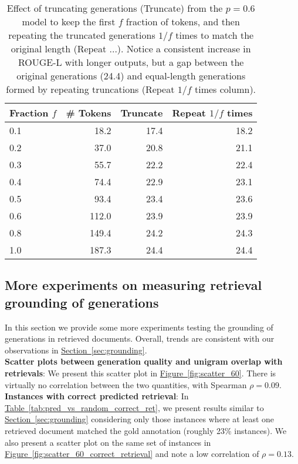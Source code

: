 \documentclass[11pt]{article}
\newcommand{\namedref}[2]{\hyperref[#2]{#1~\ref*{#2}}}
\newcommand{\sectionref}[1]{\namedref{Section}{#1}}
\newcommand{\tableref}[1]{\namedref{Table}{#1}}
\newcommand{\figureref}[1]{\namedref{Figure}{#1}}
\begin{document}
\begin{table}[h]
\small
\begin{center}
\begin{tabular}{ lrrr } 
 \toprule
 Fraction $f$ & \# Tokens  & Truncate & Repeat $1/f$ times \\
 \midrule
 0.1 & 18.2 & 17.4 & 18.2 \\
 0.2 & 37.0 & 20.8 & 21.1 \\
 0.3 & 55.7 & 22.2 & 22.4 \\
 0.4 & 74.4 & 22.9 & 23.1 \\
 0.5 & 93.4 & 23.4 & 23.6 \\
 0.6 & 112.0 & 23.9 & 23.9 \\
 0.8 & 149.4 & 24.2 & 24.3 \\
 \midrule
 1.0 & 187.3 & 24.4 & 24.4 \\
\bottomrule
\end{tabular}
\end{center}
\caption{Effect of truncating generations (Truncate) from the $p=0.6$ model to keep the first $f$ fraction of tokens, and then repeating the truncated generations $1/f$ times to match the original length (Repeat ...). Notice a consistent increase in ROUGE-L with longer outputs, but a gap between the original generations (24.4) and equal-length generations formed by repeating truncations (Repeat $1/f$ times column).}
\label{tab:rouge_length}
\end{table}


\subsection{More experiments on measuring retrieval grounding of generations}
\label{appendix:grounding_correct_retrievals}

In this section we provide some more experiments testing the grounding of generations in retrieved documents.  Overall, trends are consistent with our observations in \sectionref{sec:grounding}.\\

\noindent \textbf{Scatter plots between generation quality and unigram overlap with retrievals}: We present this scatter plot in \figureref{fig:scatter_60}. There is virtually no correlation between the two quantities, with Spearman $\rho = 0.09$.\\

\noindent \textbf{Instances with correct predicted retrieval}: In \tableref{tab:pred_vs_random_correct_ret}, we present results similar to \sectionref{sec:grounding} considering only those instances where at least one retrieved document matched the gold annotation (roughly 23\% instances). We also present a scatter plot on the same set of instances in \figureref{fig:scatter_60_correct_retrieval} and note a low correlation of $\rho = 0.13$.\\
\end{document}
